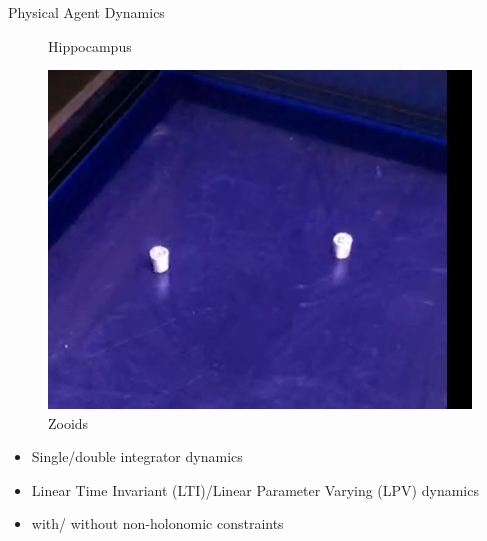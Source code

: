 \begin{frame}{Physical Agent Dynamics}
\begin{minipage}{0.3\textwidth}
\begin{figure}
			\caption{Hippocampus}
		\end{figure}	
	\end{minipage}
	\hspace{0.05cm}
	\begin{minipage}{0.3\textwidth}
		\begin{figure}
			\includegraphics[width=\textwidth]{figures/zooids.jpg}
			\caption{Zooids}
		\end{figure}	
	\end{minipage}
	\begin{itemize}		
		\item Single/double integrator dynamics
		\item Linear Time Invariant (LTI)/Linear Parameter Varying (LPV) dynamics
		\item with/ without non-holonomic constraints
	\end{itemize}
\end{frame}
